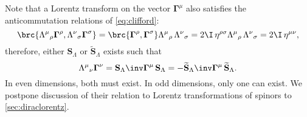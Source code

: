 \documentclass[11pt]{article}
\newcommand{\Gammab}{\boldsymbol{\Gamma}}
\renewcommand{\S}{\mathbf{S}}
\newcommand{\St}{\widetilde{\S}}
\begin{document}
Note that a Lorentz transform on the vector \(\Gammab^\mu\) also satisfies the anticommutation relations of \cref{eq:clifford}:
%
\begin{equation*}
  \brc{\Lambda^\mu{}_\rho \Gammab^\rho, \Lambda^\nu{}_\sigma \Gammab^\sigma}
    = \brc{\Gammab^\rho, \Gammab^\sigma} \Lambda^\mu{}_\rho\, \Lambda^\nu{}_\sigma
    = 2 \I\, \eta^{\rho\sigma} \Lambda^\mu{}_\rho\, \Lambda^\nu{}_\sigma
    = 2 \I\, \eta^{\mu\nu},
\end{equation*}
%
therefore, either \(\S_\Lambda\) or \(\St_\Lambda\) exists such that
%
\begin{equation}\label{eq:spinlorentz}
  \Lambda^\mu{}_\nu \Gammab^\nu = \S_\Lambda\inv \Gammab^\mu\, \S_\Lambda
  = - \St_\Lambda\inv \Gammab^\mu\, \St_\Lambda.
\end{equation}
%
In even dimensions, both must exist.
In odd dimensions, only one can exist.
We postpone discussion of their relation to Lorentz transformations of spinors to \cref{sec:diraclorentz}.
\end{document}
